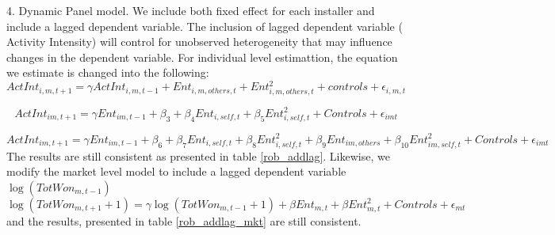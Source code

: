 \documentclass[msom,blindrev]{informs3}
\begin{document}
4. Dynamic Panel model. We include both fixed effect for each installer and include a lagged dependent variable. The inclusion of lagged dependent variable ( Activity Intensity) will control for unobserved heterogeneity that may influence changes in the dependent variable. For individual level estimattion, the equation we estimate is changed into the following: 
\begin{equation}
    ActInt_{i,m,t+1}=\gamma ActInt_{i,m,t-1}+Ent_{i,m,others,t}+Ent_{i,m,others,t}^2+  
    controls+\epsilon_{i,m,t} 
\end{equation}

\begin{equation}
    ActInt_{im,t+1}=\gamma Ent_{im,t-1}+\beta_{3}+\beta_{4} Ent_{i,self,t}+\beta_{5}Ent_{i,self,t}^2+  
   Controls+\epsilon_{imt} 
   \label{model_ind_dyn_1}
\end{equation}

\begin{equation}
    ActInt_{im,t+1}=\gamma Ent_{im,t-1}+\beta_{6}+\beta_{7} Ent_{i,self,t}+\beta_{8}Ent_{i,self,t}^2+\beta_{9}Ent_{im,others}+\beta_{10}Ent_{im,self,t}^2+  
   Controls+\epsilon_{imt} 
   \label{model_ind_dyn_2}
\end{equation}
The results are still consistent as presented in table \ref{rob_addlag}. 
Likewise, we modify the market level model to include a lagged dependent variable $\log(TotWon_{m,t-1})$
\begin{equation}
    \log(TotWon_{m,t+1}+1)=\gamma \log(TotWon_{m,t-1}+1)+\beta Ent_{m,t}+\beta Ent_{m,t}^2+Controls+\epsilon_{mt}
\end{equation} 
and the results, presented in table \ref{rob_addlag_mkt} are still consistent. 
\end{document}
